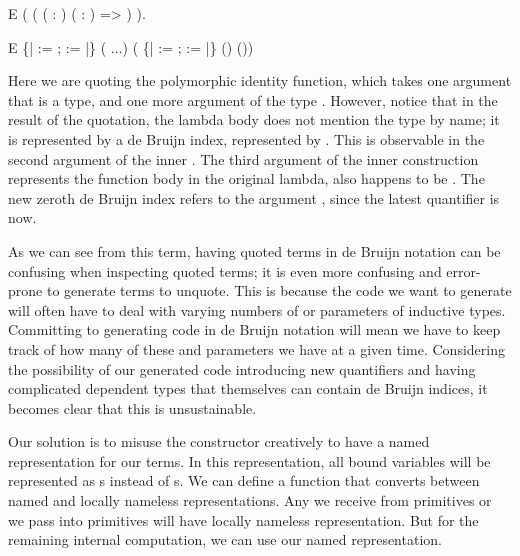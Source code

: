 \vspace{.2in}
\begin{SaveVerbatim}{E}
 ( ( ( : ) ( : ) => ) \fn{>>}\fn{=} ).
\end{SaveVerbatim}

\begin{SaveVerbatim}{E}
 \{|  := ;  :=  |\}
   ( ...)
   ( \{|  := ;  :=  |\}
            ()
            ())
\end{SaveVerbatim}

Here we are quoting the polymorphic identity function, which takes one argument  that is a type, and one more argument  of the type . However, notice that in the result of the quotation, the lambda body does not mention the type  by name; it is represented by a de Bruijn index, represented by . This is observable in the second argument of the inner .
The third argument of the inner  construction represents the function body in the original lambda, also happens to be . The new zeroth de Bruijn index refers to the argument , since the latest quantifier is  now.

As we can see from this term, having quoted terms in de Bruijn notation can be confusing when inspecting quoted terms; it is even more confusing and error-prone to generate terms to unquote. This is because the code we want to generate will often have to deal with varying numbers of \indices{} or \gls{parameter}s of \gls{inductive type}s. Committing to generating code in de Bruijn notation will mean we have to keep track of how many of these \indices{} and \gls{parameter}s we have at a given time. Considering the possibility of our generated code introducing new quantifiers and having complicated dependent types that themselves can contain de Bruijn indices, it becomes clear that this is unsustainable.

Our solution is to misuse the  constructor creatively to have a named representation for our terms. In this representation, all bound variables will be represented as s instead of s. We can define a function that converts between named and locally nameless representations. Any  we receive from \TemplateMonad{} \gls{primitive}s or we pass into \TemplateMonad{} \gls{primitive}s will have locally nameless representation. But for the remaining internal computation, we can use our named representation.

